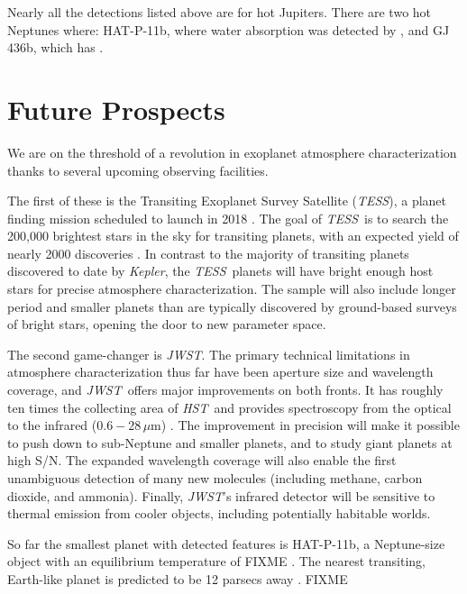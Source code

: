 \documentclass[graybox,natbib,nosecnum]{svmult}
\newcommand{\project}[1]{\textsl{#1}}
\newcommand{\JWST}{\project{JWST}}
\newcommand{\HST}{\project{HST}}
\newcommand{\TESS}{\project{TESS}}
\newcommand{\Kepler}{\project{Kepler}}
\begin{document}
Nearly all the detections listed above are for hot Jupiters. There are two hot Neptunes where: HAT-P-11b, where water absorption was detected by \cite{fraine15}, and GJ 436b, which has \citep{stevenson10, morley17, FIXME}. 

\section{Future Prospects}
We are on the threshold of a revolution in exoplanet atmosphere characterization thanks to several upcoming observing facilities. 

The first of these is the Transiting Exoplanet Survey Satellite (\TESS), a planet finding mission scheduled to launch in 2018 \citep{ricker14}.  The goal of \TESS\ is to search the 200,000 brightest stars in the sky for transiting planets, with an expected yield of nearly 2000 discoveries \citep{sullivan15}. In contrast to the majority of transiting planets discovered to date by \Kepler \citep{}, the \TESS\ planets will have bright enough host stars for precise atmosphere characterization. The sample will also include longer period and smaller planets than are typically discovered by ground-based surveys of bright stars, opening the door to new parameter space. 

The second game-changer is \JWST. The primary technical limitations in atmosphere characterization thus far have been aperture size and wavelength coverage, and \JWST\ offers major improvements on both fronts. It has roughly ten times the collecting area of \HST\, and provides spectroscopy from the optical to the infrared ($0.6 - 28\,\mu$m) \citep{FIXME}. The improvement in precision will make it possible to push down to sub-Neptune and smaller planets, and to study giant planets at high S/N. The expanded wavelength coverage will also enable the first unambiguous detection of many new molecules (including methane, carbon dioxide, and ammonia). Finally, \JWST's infrared detector will be sensitive to thermal emission from cooler objects, including potentially habitable worlds.


So far the smallest planet with detected features is HAT-P-11b, a Neptune-size object with an equilibrium temperature of FIXME \citep{fraine14}.
The nearest transiting, Earth-like planet is predicted to be 12 parsecs away \citep{dressing16}. FIXME
\end{document}
